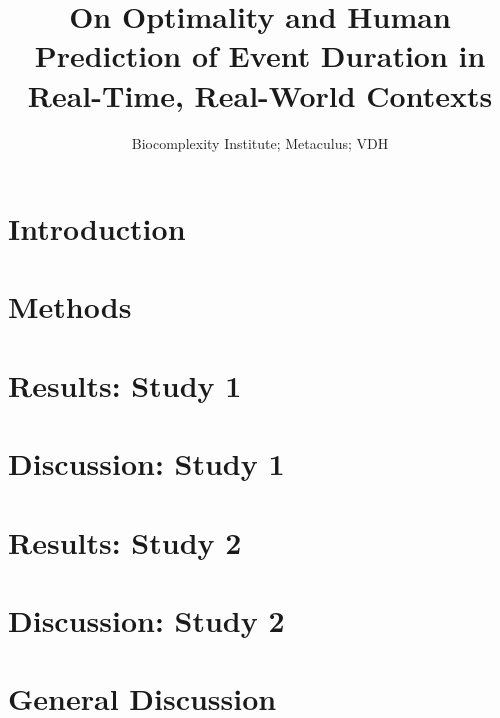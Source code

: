 \documentclass[a4paper,man,natbib]{apa6}
\title{On Optimality and Human Prediction of Event Duration in Real-Time, Real-World Contexts}
\author{Biocomplexity Institute; Metaculus; VDH}
\affiliation{TBA}
\begin{document}
\maketitle
\section{Introduction}\label{introduction}
    
\section{Methods}\label{methods}
    
\section{Results: Study 1}\label{results_s1}
    
\section{Discussion: Study 1}\label{discussion_s1}
    
\section{Results: Study 2}\label{results_s2}
    
\section{Discussion: Study 2}\label{discussion_s2}
    
\section{General Discussion}\label{discussion}
    



%    
\end{document}

